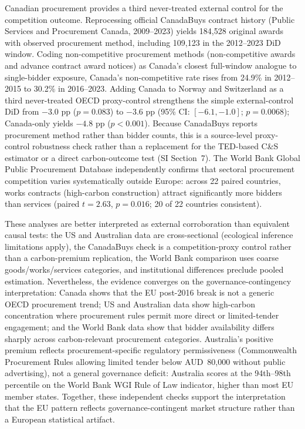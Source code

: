 \documentclass[11pt,a4paper]{article}
\begin{document}
Canadian procurement provides a third never-treated external control for the competition outcome. Reprocessing official CanadaBuys contract history (Public Services and Procurement Canada, 2009--2023) yields 184{,}528 original awards with observed procurement method, including 109{,}123 in the 2012--2023 DiD window\cite{canadaod2023}. Coding non-competitive procurement methods (non-competitive awards and advance contract award notices) as Canada's closest full-window analogue to single-bidder exposure, Canada's non-competitive rate rises from 24.9\% in 2012--2015 to 30.2\% in 2016--2023. Adding Canada to Norway and Switzerland as a third never-treated OECD proxy-control strengthens the simple external-control DiD from $-3.0$ pp ($p = 0.083$) to $-3.6$ pp (95\% CI: $[-6.1,-1.0]$; $p = 0.0068$); Canada-only yields $-4.8$ pp ($p < 0.001$). Because CanadaBuys reports procurement method rather than bidder counts, this is a source-level proxy-control robustness check rather than a replacement for the TED-based C\&S estimator or a direct carbon-outcome test (SI Section~7). The World Bank Global Public Procurement Database independently confirms that sectoral procurement competition varies systematically outside Europe: across 22 paired countries, works contracts (high-carbon construction) attract significantly more bidders than services (paired $t = 2.63$, $p = 0.016$; 20 of 22 countries consistent)\cite{worldbank2020gppd}.

These analyses are better interpreted as external corroboration than equivalent causal tests: the US and Australian data are cross-sectional (ecological inference limitations apply), the CanadaBuys check is a competition-proxy control rather than a carbon-premium replication, the World Bank comparison uses coarse goods/works/services categories, and institutional differences preclude pooled estimation. Nevertheless, the evidence converges on the governance-contingency interpretation: Canada shows that the EU post-2016 break is not a generic OECD procurement trend; US and Australian data show high-carbon concentration where procurement rules permit more direct or limited-tender engagement; and the World Bank data show that bidder availability differs sharply across carbon-relevant procurement categories. Australia's positive premium reflects procurement-specific regulatory permissiveness (Commonwealth Procurement Rules allowing limited tender below AUD~80{,}000 without public advertising), not a general governance deficit: Australia scores at the 94th--98th percentile on the World Bank WGI Rule of Law indicator, higher than most EU member states. Together, these independent checks support the interpretation that the EU pattern reflects governance-contingent market structure rather than a European statistical artifact.
\end{document}

